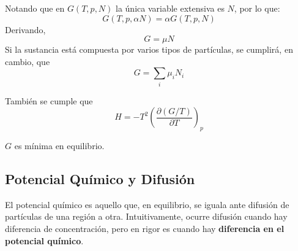 \documentclass[]{article}
\numberwithin{equation}{section}
\newcommand{\deriv}[3]{\left(\frac{\partial #1}{\partial #2} \right)_{#3}}
\newcommand{\0}{\textcolor{gray}{0}}
\begin{document}
Notando que en \(G(T,p,N)\) la única variable extensiva es  \(N\), por lo que:
\begin{equation*}
	G(T,p,\alpha N) = \alpha G(T,p,N)
\end{equation*}
Derivando,
\begin{equation}
	G = \mu N
\end{equation}
Si la sustancia está compuesta por varios tipos de partículas, se cumplirá, en cambio, que
\begin{equation}
	G = \sum_{i}\mu_i N_i
	\label{eqn:Gibbs_suma_mu}
\end{equation}

También se cumple que
\begin{equation}
	H = -T^2 \deriv{(G/T)}{T}{p}
\end{equation}

\(G\) es mínima en equilibrio.

\subsection{Potencial Químico y Difusión}
El potencial químico es aquello que, en equilibrio, se iguala ante difusión de partículas de una región a otra. Intuitivamente, ocurre difusión cuando hay diferencia de concentración, pero en rigor es cuando hay \textbf{diferencia en el potencial químico}.
\end{document}
